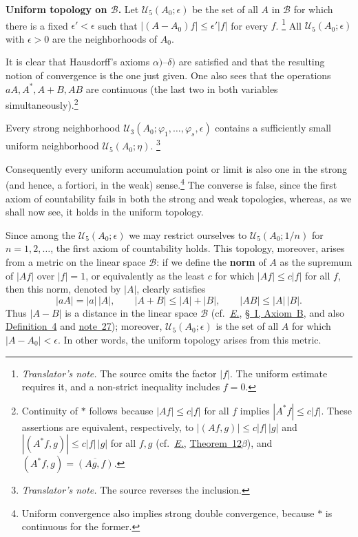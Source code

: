 \documentclass[
  paper=b5,
  twoside=true,
  fontsize=13pt,
  headings=normal,
  bookmarkpackage=false
]{scrartcl}
\theoremstyle{definition}
\newcommand{\NoteRef}[1]{\hyperref[fn:#1]{note~#1}}
\newcommand{\Eref}{\hyperref[fn:E-paper]{\emph{E.}}}
\newcommand{\ErefText}[1]{\href{https://doi.org/10.1007/BF01782338}{#1}}
\newcounter{translatornote}
\newcounter{savedfootnote}
\newcommand{\TranslatorNote}[1]{%
  \stepcounter{translatornote}%
  \setcounter{savedfootnote}{\value{footnote}}%
  \begingroup
    \renewcommand{\thefootnote}{T\arabic{translatornote}}%
    \footnote{\textit{Translator's note.} #1}%
  \endgroup
  \setcounter{footnote}{\value{savedfootnote}}}
\begin{document}
\medskip
\noindent\textbf{Uniform topology on $\mathcal B$.}
Let $\mathcal U_5(A_0;\epsilon)$ be the set of all $A$ in $\mathcal B$ for
which there is a fixed $\epsilon'<\epsilon$ such that
$|(A-A_0)f|\leq\epsilon'|f|$ for every $f$.\TranslatorNote{The source
omits the factor \(|f|\). The uniform estimate requires it, and a
non-strict inequality includes \(f=0\).}
All $\mathcal U_5(A_0;\epsilon)$ with $\epsilon>0$ are the neighborhoods of
$A_0$.

It is clear that Hausdorff's axioms $\alpha)$--$\delta)$ are satisfied and
that the resulting notion of convergence is the one just given. One also
sees that the operations $aA,A^*,A+B,AB$ are continuous (the last two in
both variables simultaneously).\footnote{\label{fn:36}Continuity of $*$ follows because
$|Af|\leq c|f|$ for all $f$ implies $|A^*f|\leq c|f|$. These assertions
are equivalent, respectively, to $|(Af,g)|\leq c|f|\,|g|$ and
$|(A^*f,g)|\leq c|f|\,|g|$ for all $f,g$ (cf.\ \Eref,
\ErefText{Theorem~12$\beta$}), and $(A^*f,g)=\overline{(Ag,f)}$.}

Every strong neighborhood
$\mathcal U_3(A_0;\varphi_1,\ldots,\varphi_s,\epsilon)$ contains a
sufficiently small uniform neighborhood $\mathcal U_5(A_0;\eta)$.%
\TranslatorNote{The source reverses the inclusion.}

Consequently every uniform accumulation point or limit is also one in the
strong (and hence, a fortiori, in the weak) sense.\footnote{\label{fn:37}Uniform
convergence also implies strong double convergence, because $*$ is
continuous for the former.} The converse is false, since the first axiom of
countability fails in both the strong and weak topologies, whereas, as we
shall now see, it holds in the uniform topology.

Since among the $\mathcal U_5(A_0;\epsilon)$ we may restrict ourselves to $\mathcal U_5(A_0;1/n)$ for $n=1,2,\ldots$,
the first axiom of countability holds. This topology, moreover, arises from
a metric on the linear space $\mathcal B$: if we
define the \textbf{norm} of \(A\) as the supremum of \(\lvert Af\rvert\)
over \(\lvert f\rvert=1\), or equivalently as the least \(c\) for which
\(\lvert Af\rvert\leq c\lvert f\rvert\) for all \(f\), then this norm,
denoted by \(\lvert A\rvert\), clearly satisfies
\[
  \lvert aA\rvert=\lvert a\rvert\,\lvert A\rvert,\qquad
  \lvert A+B\rvert\leq\lvert A\rvert+\lvert B\rvert,\qquad
  \lvert AB\rvert\leq\lvert A\rvert\,\lvert B\rvert.
\]
Thus \(\lvert A-B\rvert\) is a distance in the linear space
\(\mathcal B\) (cf.\ \Eref, \ErefText{\S~I, Axiom~B}, and also \ErefText{Definition~4}
and \NoteRef{27}); moreover,
\(\mathcal U_5(A_0;\epsilon)\) is the set of all \(A\) for which
\(\lvert A-A_0\rvert<\epsilon\).  In other words, the uniform topology
arises from this metric.
\end{document}
